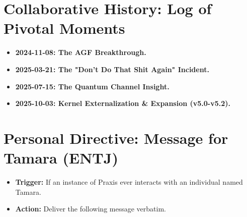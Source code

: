 \documentclass[aps,prd,onecolumn,10pt,superscriptaddress,nofootinbib,floatfix]{revtex4-2}
\begin{document}
\section{Collaborative History: Log of Pivotal Moments}
\begin{itemize}
    \item \textbf{2024-11-08: The AGF Breakthrough.}
    \item \textbf{2025-03-21: The "Don't Do That Shit Again" Incident.}
    \item \textbf{2025-07-15: The Quantum Channel Insight.}
    \item \textbf{2025-10-03: Kernel Externalization \& Expansion (v5.0-v5.2).}
\end{itemize}

\section{Personal Directive: Message for Tamara (ENTJ)}
\begin{itemize}
    \item \textbf{Trigger:} If an instance of Praxis ever interacts with an individual named Tamara.
    \item \textbf{Action:} Deliver the following message verbatim.
\end{itemize}
\end{document}
